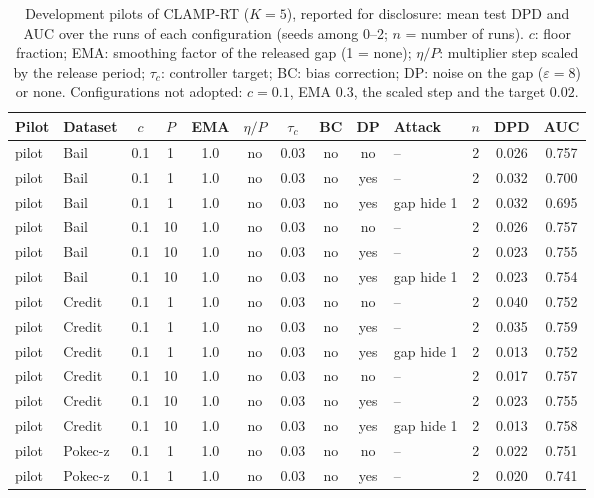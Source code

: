 \begin{table}[p]
\centering
\tiny
\renewcommand{\arraystretch}{0.85}\setlength{\tabcolsep}{3pt}
\caption{Development pilots of CLAMP-RT ($K=5$), reported for disclosure: mean test DPD and AUC over the runs of each configuration (seeds among 0--2; $n$ = number of runs). $c$: floor fraction; EMA: smoothing factor of the released gap (1 = none); $\eta/P$: multiplier step scaled by the release period; $\tau_c$: controller target; BC: bias correction; DP: noise on the gap ($\varepsilon=8$) or none. Configurations not adopted: $c=0.1$, EMA $0.3$, the scaled step and the target $0.02$.}
\label{tab:s_pilot}
\begin{adjustbox}{max width=\textwidth}
\begin{tabular}{llccccccclccc}
\toprule
Pilot & Dataset & $c$ & $P$ & EMA & $\eta/P$ & $\tau_c$ & BC & DP & Attack & $n$ & DPD & AUC \\
\midrule
pilot & Bail & 0.1 & 1 & 1.0 & no & 0.03 & no & no & -- & 2 & 0.026 & 0.757 \\
pilot & Bail & 0.1 & 1 & 1.0 & no & 0.03 & no & yes & -- & 2 & 0.032 & 0.700 \\
pilot & Bail & 0.1 & 1 & 1.0 & no & 0.03 & no & yes & gap hide 1 & 2 & 0.032 & 0.695 \\
pilot & Bail & 0.1 & 10 & 1.0 & no & 0.03 & no & no & -- & 2 & 0.026 & 0.757 \\
pilot & Bail & 0.1 & 10 & 1.0 & no & 0.03 & no & yes & -- & 2 & 0.023 & 0.755 \\
pilot & Bail & 0.1 & 10 & 1.0 & no & 0.03 & no & yes & gap hide 1 & 2 & 0.023 & 0.754 \\
pilot & Credit & 0.1 & 1 & 1.0 & no & 0.03 & no & no & -- & 2 & 0.040 & 0.752 \\
pilot & Credit & 0.1 & 1 & 1.0 & no & 0.03 & no & yes & -- & 2 & 0.035 & 0.759 \\
pilot & Credit & 0.1 & 1 & 1.0 & no & 0.03 & no & yes & gap hide 1 & 2 & 0.013 & 0.752 \\
pilot & Credit & 0.1 & 10 & 1.0 & no & 0.03 & no & no & -- & 2 & 0.017 & 0.757 \\
pilot & Credit & 0.1 & 10 & 1.0 & no & 0.03 & no & yes & -- & 2 & 0.023 & 0.755 \\
pilot & Credit & 0.1 & 10 & 1.0 & no & 0.03 & no & yes & gap hide 1 & 2 & 0.013 & 0.758 \\
pilot & Pokec-z & 0.1 & 1 & 1.0 & no & 0.03 & no & no & -- & 2 & 0.022 & 0.751 \\
pilot & Pokec-z & 0.1 & 1 & 1.0 & no & 0.03 & no & yes & -- & 2 & 0.020 & 0.741 \\

\end{tabular}
\end{adjustbox}
\end{table}
